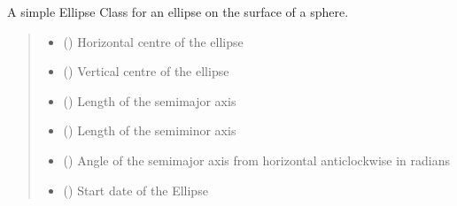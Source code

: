 \documentclass[letterpaper,10pt,english]{sphinxmanual}
\begin{document}

\begin{fulllineitems}
\label{\detokenize{users_guide:GeoSpatialTools.octtree.SpaceTimeEllipse}}
\pysigstartsignatures
{}
\pysigstopsignatures
\sphinxAtStartPar
A simple Ellipse Class for an ellipse on the surface of a sphere.
\begin{quote}\begin{description}
\begin{itemize}
\item {} 
\sphinxAtStartPar
{} () \textendash{} Horizontal centre of the ellipse

\item {} 
\sphinxAtStartPar
{} () \textendash{} Vertical centre of the ellipse

\item {} 
\sphinxAtStartPar
{} () \textendash{} Length of the semi\sphinxhyphen{}major axis

\item {} 
\sphinxAtStartPar
{} () \textendash{} Length of the semi\sphinxhyphen{}minor axis

\item {} 
\sphinxAtStartPar
{} () \textendash{} Angle of the semi\sphinxhyphen{}major axis from horizontal anti\sphinxhyphen{}clockwise in radians

\item {} 
\sphinxAtStartPar
{} () \textendash{} Start date of the Ellipse


\end{itemize}
\end{description}
\end{quote}
\end{fulllineitems}
\end{document}
